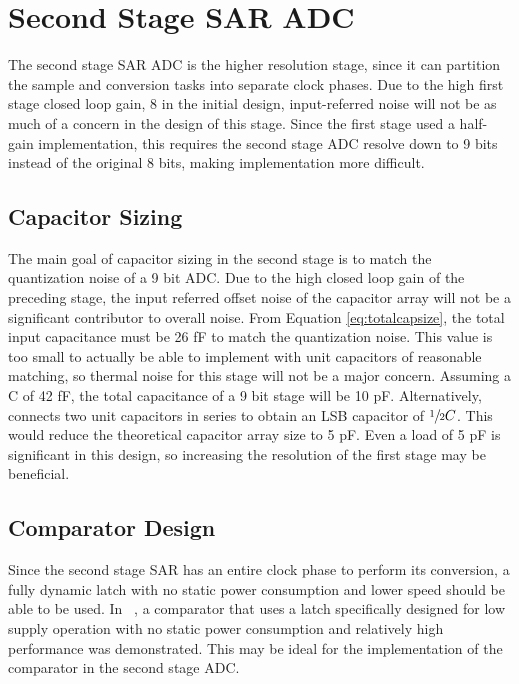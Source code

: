 \chapter{Second Stage SAR ADC}
The second stage SAR ADC is the higher resolution stage, since it can partition the sample and conversion tasks into separate clock phases. Due to the high first stage closed loop gain, 8 in the initial design, input-referred noise will not be as much of a concern in the design of this stage. Since the first stage used a half-gain implementation, this requires the second stage ADC resolve down to 9 bits instead of the original 8 bits, making implementation more difficult. 
\section{Capacitor Sizing}
The main goal of capacitor sizing in the second stage is to match the quantization noise of a 9 bit ADC. Due to the high closed loop gain of the preceding stage, the input referred offset noise of the capacitor array will not be a significant contributor to overall noise. From Equation \ref{eq:totalcapsize}, the total input capacitance must be 26 fF to match the quantization noise. This value is too small to actually be able to implement with unit capacitors of reasonable matching, so thermal noise for this stage will not be a major concern. Assuming a C of 42 fF, the total capacitance of a 9 bit stage will be 10 pF. Alternatively, ~\cite{5714725} connects two unit capacitors in series to obtain an LSB capacitor of $\sfrac{1}{2}C$. This would reduce the theoretical capacitor array size to 5 pF. Even a load of 5 pF is significant in this design, so increasing the resolution of the first stage may be beneficial. 
\section{Comparator Design}
Since the second stage SAR has an entire clock phase to perform its conversion, a fully dynamic latch with no static power consumption and lower speed should be able to be used. In ~\cite{5282590}, a comparator that uses a latch specifically designed for low supply operation with no static power consumption and relatively high performance was demonstrated. This may be ideal for the implementation of the comparator in the second stage ADC. 